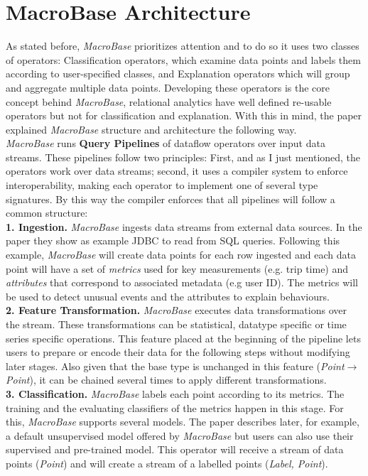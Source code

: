 \documentclass[11pt, titlepage]{article}
\begin{document}
	\section{MacroBase Architecture}
		As stated before, \textit{MacroBase} prioritizes attention and to do so it uses two classes of operators: Classification operators, which examine data points and labels them according to user-specified classes, and Explanation operators which will group and aggregate multiple data points. Developing these operators is the core concept behind \textit{MacroBase}, relational analytics have well defined re-usable operators but not for classification and explanation. With this in mind, the paper explained \textit{MacroBase} structure and architecture the following way.
		\\\textit{MacroBase} runs \textbf{Query Pipelines} of dataflow operators over input data streams. These pipelines follow two principles: First, and as I just mentioned, the operators work over data streams; second, it uses a compiler system to enforce interoperability, making each operator to implement one of several type signatures. By this way the compiler enforces that all pipelines will follow a common structure:
		\\\textbf{1. Ingestion.} \textit{MacroBase} ingests data streams from external data sources. In the paper they show as example JDBC to read from SQL queries. Following this example, \textit{MacroBase} will create data points for each row ingested and each data point will have a set of \textit{metrics} used for key measurements (e.g. trip time) and \textit{attributes} that correspond to associated metadata (e.g user ID). The metrics will be used to detect unusual events and the attributes to explain behaviours.
		\\\textbf{2. Feature Transformation.} \textit{MacroBase} executes data transformations over the stream. These transformations can be statistical, datatype specific or time series specific operations. This feature placed at the beginning of the pipeline lets users to prepare or encode their data for the following steps without modifying later stages. Also given that the base type is unchanged in this feature (\textit{Point}$\rightarrow$\textit{Point}), it can be chained several times to apply different transformations.
		\\\textbf{3. Classification.} \textit{MacroBase} labels each point according to its metrics. The training and the evaluating classifiers of the metrics happen in this stage. For this, \textit{MacroBase} supports several models. The paper describes later, for example, a default unsupervised model offered by \textit{MacroBase}  but users can also use their supervised and pre-trained model. This operator will receive a stream of data points (\textit{Point}) and will create a stream of a labelled points (\textit{Label, Point}).
\end{document}
